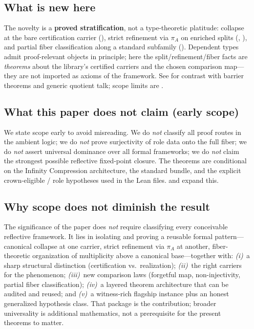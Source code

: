 \documentclass[11pt]{article}
\begin{document}
\subsection{What is new here}\label{sec:intro-new}
The novelty is a \textbf{proved stratification}, not a type-theoretic platitude: collapse at the bare certification carrier (), strict refinement via $\pi_A$ on enriched splits (, ), and partial fiber classification along a standard subfamily (). Dependent types admit proof-relevant objects in principle; here the split/refinement/fiber facts are \emph{theorems} about the library's certified carriers and the chosen comparison map---they are not imported as axioms of the framework. See  for contrast with barrier theorems and generic quotient talk; scope limits are .

\subsection{What this paper does not claim (early scope)}\label{sec:intro-not-claimed}
We state scope early to avoid misreading. We do \emph{not} classify all proof routes in the ambient logic; we do \emph{not} prove surjectivity of role data onto the full fiber; we do \emph{not} assert universal dominance over all formal frameworks; we do \emph{not} claim the strongest possible reflective fixed-point closure. The theorems are conditional on the Infinity Compression architecture, the standard bundle, and the explicit crown-eligible / role hypotheses used in the Lean files.  and  expand this.

\subsection{Why scope does not diminish the result}\label{sec:intro-scope-value}
The significance of the paper does \emph{not} require classifying every conceivable reflective framework. It lies in isolating and proving a reusable formal pattern---canonical collapse at one carrier, strict refinement via $\pi_A$ at another, fiber-theoretic organization of multiplicity above a canonical base---together with: \emph{(i)}~a sharp structural distinction (certification vs.\ realization); \emph{(ii)}~the right carriers for the phenomenon; \emph{(iii)}~new comparison laws (forgetful map, non-injectivity, partial fiber classification); \emph{(iv)}~a layered theorem architecture that can be audited and reused; and \emph{(v)}~a witness-rich flagship instance plus an honest generalized hypothesis class. That package is the contribution; broader universality is additional mathematics, not a prerequisite for the present theorems to matter.
\end{document}
